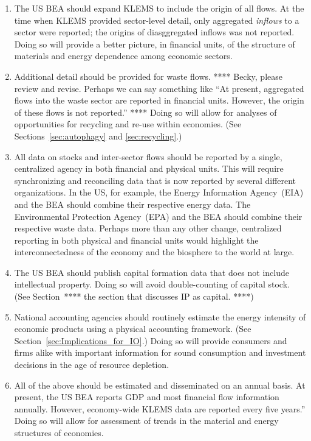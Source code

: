 \begin{enumerate}
	\item{The US BEA should expand KLEMS to include the origin of all flows.
			At the time when KLEMS provided sector-level detail, 
			only aggregated \emph{inflows} to a sector were reported;
			the origins of diasggregated inflows was not reported.
			Doing so will provide a better picture, in financial units,
			of the structure of materials and energy dependence among economic sectors.}

	\item{Additional detail should be provided for waste flows.
		 	**** Becky, please review and revise. 
			Perhaps we can say something like
			``At present, aggregated flows into the waste sector are reported in financial units. 
			However, the origin of these flows is not reported.'' ****
			Doing so will allow for analyses of opportunities for recycling and re-use
			within economies.
			(See Sections~\ref{sec:autophagy} and \ref{sec:recycling}.)}

	\item{All data on stocks and inter-sector flows should be reported by a single, 
			centralized agency
			in both financial and physical units.
			This will require synchronizing and reconciling data that is now reported
			by several different organizations. 
			In the US, for example, the Energy Information Agency~(EIA) and the BEA
			should combine their respective energy data.
			The Environmental Protection Agency~(EPA) and the BEA 
			should combine their respective waste data.
			Perhaps more than any other change, 
			centralized reporting in both physical and financial units 
			would highlight the interconnectedness
			of the economy and the biosphere to the world at large.}

	\item{The US BEA should publish capital formation data that does not include
			intellectual property. 
			Doing so will avoid double-counting of capital stock.
			(See Section~**** the section that discusses IP as capital. ****)}

	\item{National accounting agencies should routinely estimate 
			the energy intensity of economic products using a physical accounting framework.
			(See Section~\ref{sec:Implications_for_IO}.)
			Doing so will provide consumers and firms alike with important
			information for sound consumption and investment decisions 
			in the age of resource depletion.}

	\item{All of the above should be estimated and disseminated on an annual basis.%
			At present, the US BEA reports GDP and most financial flow information 
			annually.
			However, economy-wide KLEMS data are reported every five years.'' 
			Doing so will allow for assessment of trends 
			in the material and energy structures of economies.}

\end{enumerate}

